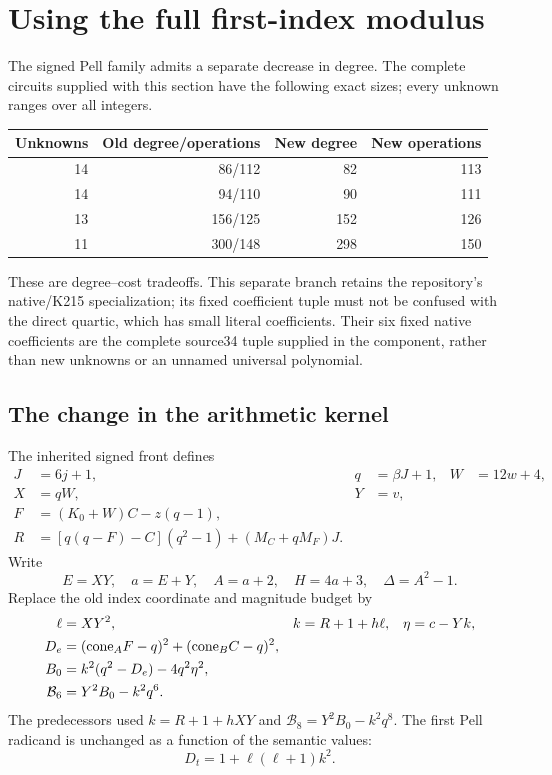 \section{Using the full first-index modulus}
\label{sec:indexmodulus}

The signed Pell family admits a separate decrease in degree. The complete
circuits supplied with this section have the following exact sizes; every
unknown ranges over all integers.
\begin{center}
\begin{tabular}{rrrr}
Unknowns&Old degree/operations&New degree&New operations\\\hline
14&86/112&82&113\\
14&94/110&90&111\\
13&156/125&152&126\\
11&300/148&298&150
\end{tabular}
\end{center}
These are degree--cost tradeoffs. This separate branch retains the repository's native/K215 specialization; its fixed coefficient tuple must not be confused with the direct quartic, which has small literal coefficients. Their six fixed native coefficients are
the complete source34 tuple supplied in the component, rather than new
unknowns or an unnamed universal polynomial.

\subsection{The change in the arithmetic kernel}
The inherited signed front defines
\begin{align*}
 J&=6j+1,&q&=\beta J+1,&W&=12w+4,\\
 X&=qW,&Y&=v,&&\\
 F&=(K_0+W)C-z(q-1),&&&&\\
 R&=[q(q-F)-C](q^2-1)+(M_C+qM_F)J.&&&&
\end{align*}
Write
\[
 E=XY,\quad a=E+Y,\quad A=a+2,\quad H=4a+3,
 \quad \Delta=A^2-1.
\]
Replace the old index coordinate and magnitude budget by
\begin{align}
 \ell&=XY^2,&k&=R+1+h\ell,&\eta&=c-Yk,\label{eq:rebasedk}\\
 D_e&=(\mathrm{cone}_A F-q)^2+(\mathrm{cone}_B C-q)^2,&&&\notag\\
 B_0&=k^2(q^2-D_e)-4q^2\eta^2,&&&\notag\\
 \mathcal B_6&=Y^2B_0-k^2q^6.&&&\label{eq:rebasebudget}
\end{align}
The predecessors used $k=R+1+hXY$ and
$\mathcal B_8=Y^2B_0-k^2q^8$. The first Pell radicand is unchanged
as a function of the semantic values:
\[
 D_t=1+\ell(\ell+1)k^2.
\]

